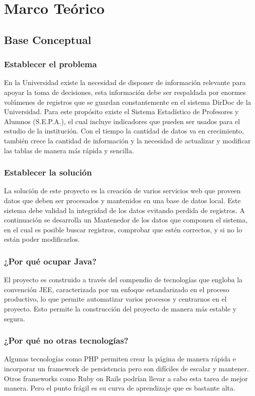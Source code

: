 \documentclass[a4paper,12pt,openany,oneside]{book}
\begin{document}
\chapter{Marco Teórico}
\thispagestyle{empty}
\section{Base Conceptual}
\subsection{Establecer el problema}
En la Universidad existe la necesidad de disponer de información relevante para apoyar la toma de decisiones, esta información debe ser respaldada por enormes volúmenes de registros que se guardan constantemente en el sistema DirDoc de la Universidad. Para este propósito existe el Sistema Estadístico de Profesores y Alumnos (S.E.P.A.), el cual incluye indicadores que pueden ser usados para el estudio de la institución. Con el tiempo la cantidad de datos va en crecimiento, también crece la cantidad de información y la necesidad de actualizar y modificar las tablas de manera más rápida y sencilla.
\subsection{Establecer la solución}
La solución de este proyecto es la creación de varios servicios web que proveen datos que deben ser procesados y mantenidos en una base de datos local. Este sistema debe validad la integridad de los datos evitando perdida de registros. A continuación se desarrolla un Mantenedor de los datos que componen el sistema, en el cual es posible buscar registros, comprobar que estén correctos, y si no lo están poder modificarlos.
\subsection{¿Por qué ocupar Java?}
El proyecto es construido a través del compendio de tecnologías que engloba la convención JEE, caracterizada por un enfoque estandarizado en el proceso productivo, lo que permite automatizar varios procesos y centrarnos en el proyecto. Esto permite la construcción del proyecto de manera más estable y segura.
\subsection{¿Por qué no otras tecnologías?}
Algunas tecnologías como PHP permiten crear la página de manera rápida e incorporar un framework de persistencia pero son difíciles de escalar y mantener.  Otros frameworks como Ruby on Rails podrían llevar a cabo esta tarea de mejor manera. Pero el punto frágil es su curva de aprendizaje que es bastante alta.
\end{document}
